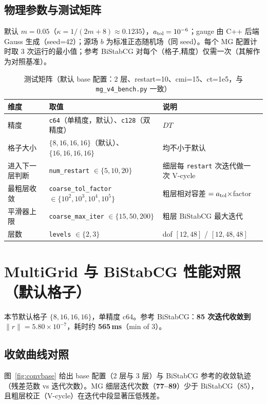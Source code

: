 \documentclass[11pt,a4paper]{article}
\begin{document}
\subsection{物理参数与测试矩阵}
默认 $m=0.05$（$\kappa=1/(2m+8)\approx0.1235$），$a_{\rm tol}=10^{-6}$；gauge 由 C++ 后端
Gauss 生成（seed=42）；源场 $b$ 为标准正态随机场（同 seed）。每个 MG 配置计时取
3 次运行的最小值；参考 BiStabCG 对每个（格子,精度）仅需一次（其解作为对照基准）。

\begin{table}[h]
\centering
\begin{tabular}{llll}
\toprule
维度 & 取值 & 说明 \\
\midrule
精度 & \texttt{c64}（单精度，默认）、\texttt{c128}（双精度） & $DT$ \\
格子大小 & $\{8,16,16,16\}$（默认）、$\{16,16,16,16\}$ & 均不小于默认 \\
进入下一层判断 & \texttt{num\_restart} $\in\{5,10,20\}$ & 细层每 \texttt{restart} 次迭代做一次 V-cycle \\
最粗层收敛 & \texttt{coarse\_tol\_factor} $\in\{10^2,10^3,10^4,10^5\}$ & 粗层相对容差 $=a_{\rm tol}\times$factor \\
平滑器上限 & \texttt{coarse\_max\_iter} $\in\{15,50,200\}$ & 粗层 BiStabCG 最大迭代 \\
层数 & \texttt{levels} $\in\{2,3\}$ & dof $[12,48]$ / $[12,48,48]$ \\
\bottomrule
\end{tabular}
\caption{测试矩阵（默认 base 配置：2 层、restart=10、cmi=15、ct=1e5，与
\texttt{mg\_v4\_bench.py} 一致）}
\end{table}

\section{MultiGrid 与 BiStabCG 性能对照（默认格子）}
\label{sec:base}

本节默认格子 $\{8,16,16,16\}$，单精度 c64。参考 BiStabCG：\textbf{85 次迭代收敛到
$\|r\|=5.80\times10^{-7}$}，耗时约 \textbf{565\,ms}（min of 3）。

\subsection{收敛曲线对照}
图~\ref{fig:convbase} 给出 base 配置（2 层与 3 层）与 BiStabCG 参考的收敛轨迹
（残差范数 vs 迭代次数）。MG 细层迭代次数（\textbf{77--89}）少于 BiStabCG（85），
且粗层校正（V-cycle）在迭代中段显著压低残差。
\end{document}
